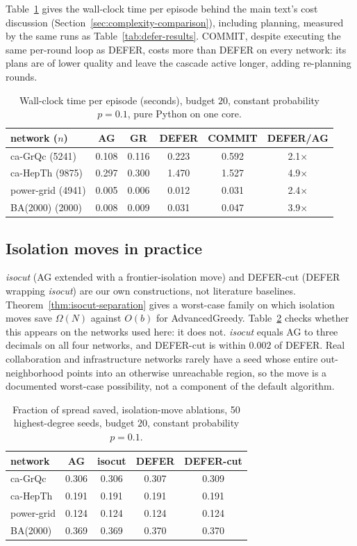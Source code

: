 \documentclass[11pt]{article}
\theoremstyle{definition}
\theoremstyle{remark}
\newcommand{\up}{\rule{0pt}{2.6ex}}
\begin{document}
Table~\ref{tab:timing} gives the wall-clock time per episode behind the main text's cost discussion (Section~\ref{sec:complexity-comparison}), including planning, measured by the same runs as Table~\ref{tab:defer-results}. COMMIT, despite executing the same per-round loop as DEFER, costs more than DEFER on every network: its plans are of lower quality and leave the cascade active longer, adding re-planning rounds.

\begin{table}[h]
\centering
\caption{Wall-clock time per episode (seconds), budget $20$, constant probability $p=0.1$, pure Python on one core.\label{tab:timing}}
\small
\begin{tabular}{@{}lccccc@{}}
\hline
\up network ($n$) & AG & GR & DEFER & COMMIT & DEFER/AG \\
\hline
\up ca-GrQc (5241) & 0.108 & 0.116 & 0.223 & 0.592 & 2.1$\times$ \\
ca-HepTh (9875) & 0.297 & 0.300 & 1.470 & 1.527 & 4.9$\times$ \\
power-grid (4941) & 0.005 & 0.006 & 0.012 & 0.031 & 2.4$\times$ \\
BA(2000) (2000) & 0.008 & 0.009 & 0.031 & 0.047 & 3.9$\times$ \\
\hline
\end{tabular}
\end{table}

\subsection{Isolation moves in practice}\label{sec:isocut-practice}

\emph{isocut} (AG extended with a frontier-isolation move) and DEFER-cut (DEFER wrapping \emph{isocut}) are our own constructions, not literature baselines. Theorem~\ref{thm:isocut-separation} gives a worst-case family on which isolation moves save $\Omega(N)$ against $O(b)$ for AdvancedGreedy. Table~\ref{tab:isocut} checks whether this appears on the networks used here: it does not. \emph{isocut} equals AG to three decimals on all four networks, and DEFER-cut is within $0.002$ of DEFER. Real collaboration and infrastructure networks rarely have a seed whose entire out-neighborhood points into an otherwise unreachable region, so the move is a documented worst-case possibility, not a component of the default algorithm.

\begin{table}[h]
\centering
\caption{Fraction of spread saved, isolation-move ablations, 50 highest-degree seeds, budget $20$, constant probability $p=0.1$.\label{tab:isocut}}
\small
\begin{tabular}{@{}lcccc@{}}
\hline
\up network & AG & isocut & DEFER & DEFER-cut \\
\hline
\up ca-GrQc & 0.306 & 0.306 & 0.307 & 0.309 \\
ca-HepTh & 0.191 & 0.191 & 0.191 & 0.191 \\
power-grid & 0.124 & 0.124 & 0.124 & 0.124 \\
BA(2000) & 0.369 & 0.369 & 0.370 & 0.370 \\
\hline
\end{tabular}
\end{table}
\end{document}
